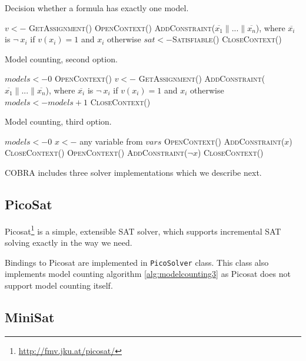 \begin{algorithm}[h]
\caption{Decision whether a formula has exactly one model.}
\label{alg:onlyonemodel}
\DontPrintSemicolon
{}
$v <- $ \textsc{GetAssignment()}\;
\textsc{OpenContext()}\;
\textsc{AddConstraint($\overline{x_1}\| ... \|\overline{x_n}$)},
  where $\overline{x_i}$ is $\neg\:x_i$ if $v(x_i) = 1$ and $x_i$ otherwise\;
$sat <- $\textsc{Satisfiable()}\;
\textsc{CloseContext()}\;
\end{algorithm}
\begin{algorithm}[h]
\caption{Model counting, second option.}
\label{alg:modelcounting2}
\DontPrintSemicolon
$models <- 0$\;
\textsc{OpenContext()}\;
 {
  $v <- $ \textsc{GetAssignment()}\;
  \textsc{AddConstraint($\overline{x_1}\| ... \|\overline{x_n}$)},
    where $\overline{x_i}$ is $\neg\:x_i$ if $v(x_i) = 1$ and $x_i$ otherwise\;
  $models <- models + 1$\;
}
\textsc{CloseContext()}\;
\end{algorithm}
\begin{algorithm}[h!]
\caption{Model counting, third option.}
\label{alg:modelcounting3}
\DontPrintSemicolon
$models <- 0$\;
$x <- $ any variable from $vars$\;
\textsc{OpenContext()}\;
\textsc{AddConstraint}($x$)\;
\textsc{CloseContext()}\;
\textsc{OpenContext()}\;
\textsc{AddConstraint}($\neg x$)\;
\textsc{CloseContext()}\;
\end{algorithm}

COBRA includes three solver implementations which we describe next.

\subsection{PicoSat}
Picosat\footnote{\url{http://fmv.jku.at/picosat/}} \cite{picosat} is a simple,
  extensible SAT solver, which supports incremental SAT solving exactly in the way
  we need.

Bindings to Picosat are implemented in \texttt{PicoSolver} class.
This class also implements model counting algorithm \ref{alg:modelcounting3}
 as Picosat does not support model counting itself.


\subsection{MiniSat}

